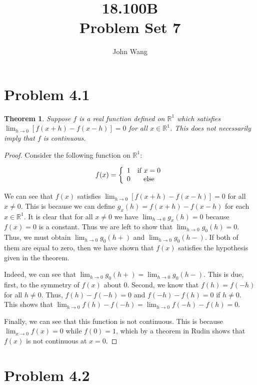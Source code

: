 \documentclass[psamsfonts]{amsart}
\title{18.100B \\
Problem Set 7}
\author{John Wang}
\newtheorem{thm}{Theorem}[section]
\theoremstyle{definition}
\theoremstyle{remark}
\numberwithin{equation}{section}
\begin{document}
\maketitle

\section{Problem 4.1}

\begin{thm}
Suppose $f$ is a real function defined on $\mathbb{R}^1$ which satisfies $\lim_{h \to 0} [f(x+h) - f(x-h)] = 0$ for all $x \in \mathbb{R}^1$. This does not necessarily imply that $f$ is continuous.
\end{thm}

\begin{proof}
Consider the following function on $\mathbb{R}^1$:

\begin{equation}
f(x) = \left\{ \begin{array}{c c}
1 & \text{if } x = 0 \\
0 & \text{else}
\end{array} \right.
\end{equation}

We can see that $f(x)$ satisfies $\lim_{h \to 0} [f(x+h) - f(x-h)] = 0$ for all $x \neq 0$. This is because we can define $g_x(h) = f(x+h) - f(x-h)$ for each $x \in \mathbb{R}^1$. It is clear that for all $x \neq 0$ we have $\lim_{h \to 0} g_x(h) = 0$ because $f(x) = 0$ is a constant. Thus we are left to show that $\lim_{h \to 0} g_0(h) = 0$. Thus, we must obtain $\lim_{h \to 0} g_0(h+)$ and $\lim_{h \to 0} g_0(h-)$. If both of them are equal to zero, then we have shown that $f(x)$ satisfies the hypothesis given in the theorem.

Indeed, we can see that $\lim_{h \to 0} g_0(h+)=\lim_{h \to 0} g_0(h-)$. This is due, first, to the symmetry of $f(x)$ about $0$. Second, we know that $f(h) = f(-h)$ for all $h \neq 0$. Thus, $f(h) - f(-h) = 0$ and $f(-h) - f(h) = 0$ if $h \neq 0$. This shows that $\lim_{h \to 0} f(h) - f(-h) = \lim_{h \to 0} f(-h) - f(h) = 0$.

Finally, we can see that this function is not continuous. This is because $\lim_{x \to 0} f(x) = 0$ while $f(0) = 1$, which by a theorem in Rudin shows that $f(x)$ is not continuous at $x = 0$.  
\end{proof}

\section{Problem 4.2}
\end{document}
